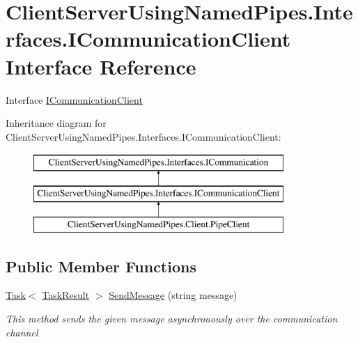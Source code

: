\hypertarget{interface_client_server_using_named_pipes_1_1_interfaces_1_1_i_communication_client}{}\section{Client\+Server\+Using\+Named\+Pipes.\+Interfaces.\+I\+Communication\+Client Interface Reference}
\label{interface_client_server_using_named_pipes_1_1_interfaces_1_1_i_communication_client}


Interface \hyperlink{interface_client_server_using_named_pipes_1_1_interfaces_1_1_i_communication_client}{I\+Communication\+Client}  


Inheritance diagram for Client\+Server\+Using\+Named\+Pipes.\+Interfaces.\+I\+Communication\+Client\+:\begin{figure}[H]
\begin{center}
\leavevmode
\includegraphics[height=3.000000cm]{interface_client_server_using_named_pipes_1_1_interfaces_1_1_i_communication_client}
\end{center}
\end{figure}
\subsection*{Public Member Functions}
\begin{DoxyCompactItemize}
\item 
\hyperlink{class_system_1_1_threading_1_1_tasks_1_1_task}{Task}$<$ \hyperlink{class_client_server_using_named_pipes_1_1_utilities_1_1_task_result}{Task\+Result} $>$ \hyperlink{interface_client_server_using_named_pipes_1_1_interfaces_1_1_i_communication_client_a07c2acf92bd0b99d704156010b47eff1}{Send\+Message} (string message)
\begin{DoxyCompactList}\small\item\em This method sends the given message asynchronously over the communication channel \end{DoxyCompactList}\end{DoxyCompactItemize}


